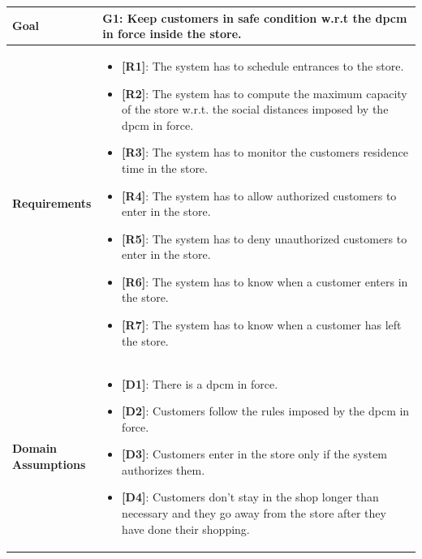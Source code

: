 \begin{table}[H]
    \centering
    \begin{tabular}{| m{} | m{} |}
        \hline
        \textbf{Goal} &
        \textbf{G1: Keep customers in safe condition w.r.t the \gls{dpcm} in force inside the store.} \\
        \hline
        \textbf{Requirements} &
        \begin{itemize}
            \item {\textbf{[R1]}}: The system has to schedule entrances to the store.
            \item {\textbf{[R2]}}: The system has to compute the maximum capacity of the store w.r.t. the social distances imposed by the \gls{dpcm} in force.
            \item {\textbf{[R3]}}: The system has to monitor the customers residence time in the store.
            \item {\textbf{[R4]}}: The system has to allow authorized customers to enter in the store.
            \item {\textbf{[R5]}}: The system has to deny unauthorized customers to enter in the store.
            \item {\textbf{[R6]}}: The system has to know when a customer enters in the store.
            \item {\textbf{[R7]}}: The system has to know when a customer has left the store.
        \end{itemize} \\
        \hline
        \shortstack[l]{\textbf{Domain} \\ \textbf{Assumptions}} &
        \begin{itemize}
            \item {\textbf{[D1]}}: There is a \gls{dpcm} in force.
            \item {\textbf{[D2]}}: Customers follow the rules imposed by the \gls{dpcm} in force.
            \item {\textbf{[D3]}}: Customers enter in the store only if the system authorizes them.
            \item {\textbf{[D4]}}: Customers don't stay in the shop longer than necessary and they go away from the store after they have done their shopping.
        \end{itemize} \\
        \hline
    \end{tabular}
\end{table}

